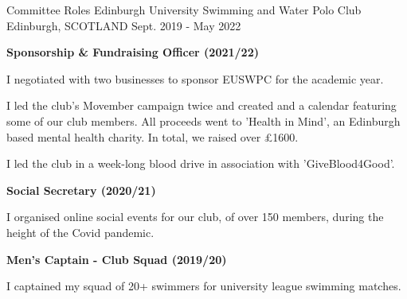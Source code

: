 \begin{cventries}
  \cventry
    {Committee Roles} %
    {Edinburgh University Swimming and Water Polo Club} %
    {Edinburgh, SCOTLAND} %
    {Sept. 2019 - May 2022} %
    {
      \textbf{Sponsorship \& Fundraising Officer (2021/22)}
      \vspace{1.35em}
      \begin{cvitems} %
        \item I negotiated with two businesses to sponsor EUSWPC for the academic year.
        \item I led the club's Movember campaign twice and created and a calendar featuring some of our club members. All proceeds went to 'Health in Mind', an Edinburgh based mental health charity. In total, we raised over £1600.
        \item I led the club in a week-long blood drive in association with 'GiveBlood4Good'.
      \end{cvitems}
      \vspace{1.35em}
      \textbf{Social Secretary (2020/21)}
      \vspace{1.35em}
      \begin{cvitems}
        \item I organised online social events for our club, of over 150 members, during the height of the Covid pandemic.
      \end{cvitems}
      \vspace{1.35em}
      \textbf{Men's Captain - Club Squad (2019/20)}
      \vspace{1.35em}
      \begin{cvitems}
        \item I captained my squad of 20+ swimmers for university league swimming matches.
      \end{cvitems}
    }
\end{cventries}
